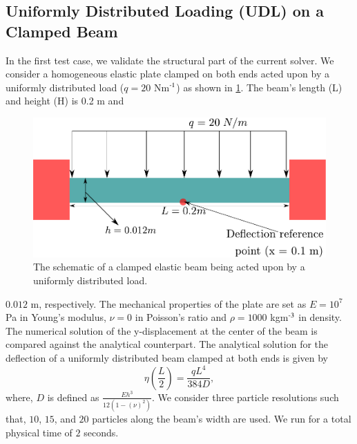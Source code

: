 \subsection{Uniformly Distributed Loading (UDL) on a Clamped Beam}
\label{sec:udl}
In the first test case, we validate the structural part of the current solver.
We consider a homogeneous elastic plate clamped on both ends acted upon by a
uniformly distributed load ($q = 20$ Nm$\textsuperscript{-1}$) as shown in
\cref{fig:udl-schematic}. The beam's length (L) and height (H) is 0.2 m and
\begin{figure}
  \centering
  \includegraphics[scale=0.5]{images/fsi/images/khayyer_2021_udl/schematic}
  \caption{The schematic of a clamped elastic beam being acted upon by a
    uniformly distributed load.}
\label{fig:udl-schematic}
\end{figure}
$0.012$ m, respectively. The mechanical properties of the plate are set as
$E=10^7$ Pa in Young's modulus, $\nu=0$ in Poisson's ratio and $\rho=1000$
kgm$\textsuperscript{-3}$ in density. The numerical solution of the
y-displacement at the center of the beam is compared against the analytical
counterpart. The analytical solution for the deflection of a uniformly
distributed beam clamped at both ends is given by
\begin{equation}
  \label{eq:fsi:ce-tvf}
  \eta\left(\frac{L}{2}\right) = \frac{qL^4}{384 D},
\end{equation}
where, $D$ is defined as $\frac{E h^3}{12 (1 - (\nu)^2)}$. We consider three
particle resolutions such that, $10$, $15$, and $20$ particles along the beam's
width are used. We run for a total physical time of $2$ seconds.

